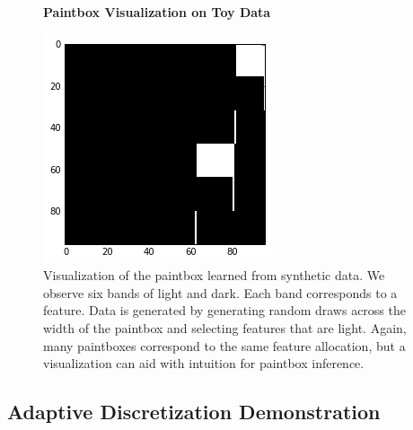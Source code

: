 \documentclass{article}
\begin{document}
\begin{figure}[demo_box]
\vskip 0.2in
\begin{center}
\textbf{Paintbox Visualization on Toy Data}\par\medskip
\centerline{\includegraphics[width=\columnwidth]{demo_box}}
\caption{Visualization of the paintbox learned from synthetic data.  We observe six bands of light and dark.  Each band corresponds to a feature.  Data is generated by generating random draws across the width of the paintbox and selecting features that are light.  Again, many paintboxes correspond to the same feature allocation, but a visualization can aid with intuition for paintbox inference.}
\label{demo_box}
\end{center}
\vskip -0.2in
\end{figure}

\subsection{Adaptive Discretization Demonstration}
\end{document}
